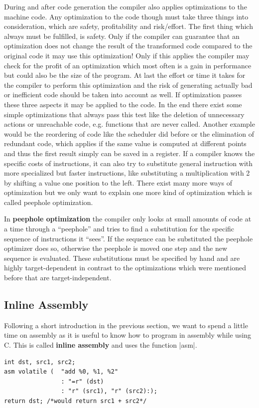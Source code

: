 {During and after code generation the compiler also applies optimizations to the machine code.
Any optimization to the code though must take three things into consideration, which are safety, profitability and risk/effort.
The first thing which always must be fulfilled, is safety.
Only if the compiler can guarantee that an optimization does not change the result of the transformed code compared to the original code it may use this optimization!
Only if this applies the compiler may check for the profit of an optimization which most often is a gain in performance but could also be the size of the program.
At last the effort or time it takes for the compiler to perform this optimization and the risk of generating actually bad or inefficient code should be taken into account as well.
If optimization passes these three aspects it may be applied to the code.
In the end there exist some simple optimizations that always pass this test like the deletion of unnecessary actions or unreachable code, e.g. functions that are never called.
Another example would be the reordering of code like the scheduler did before or the elimination of redundant code, which applies if the same value is computed at different points and thus the first result simply can be saved in a register.
If a compiler knows the specific costs of instructions, it can also try to substitute general instruction with more specialized but faster instructions, like substituting a multiplication with 2 by shifting a value one position to the left.
There exist many more ways of optimization but we only want to explain one more kind of optimization which is called peephole optimization.

In \textbf{peephole optimization} the compiler only looks at small amounts of code at a time through a ``peephole'' and tries to find a substitution for the specific sequence of instructions it ``sees''.
If the sequence can be substituted the peephole optimizer does so, otherwise the peephole is moved one step and the new sequence is evaluated.
These substitutions must be specified by hand and are highly target-dependent in contrast to the optimizations which were mentioned before that are target-independent.

\subsection{Inline Assembly}
\label{section:asm}
Following a short introduction in the previous section, we want to spend a little time on assembly as it is useful to know how to program in assembly while using C.
This is called \textbf{inline assembly} and uses the function |asm|.
\begin{lstlisting}[caption= Exemplatory Assembly invkation, label=lst:inlineasm, float, floatplacement=htbp]
int dst, src1, src2;
asm volatile (  "add %0, %1, %2"
                : "=r" (dst)
                : "r" (src1), "r" (src2):);
return dst; /*would return src1 + src2*/
\end{lstlisting}

}
